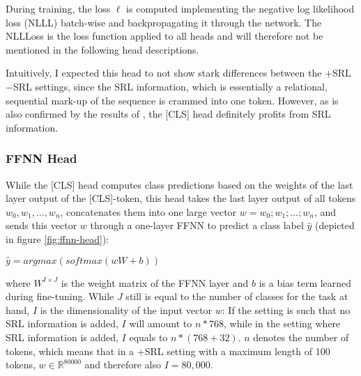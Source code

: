 During training, the loss $\ell $ is computed implementing the negative log likelihood loss
(NLLL) batch-wise and
backpropagating it through the network. The NLLLoss is the loss function applied to all
heads and will therefore not be mentioned in the following head descriptions.

Intuitively, I expected this head to not show stark differences between the +SRL $-$SRL settings,
since the SRL information, which is essentially a relational, sequential mark-up of the sequence is
crammed into one token. However, as is also confirmed by the results of \cite{zhang2019semantics},
the [CLS] head definitely profits from SRL information.


\subsubsection{FFNN Head}


While the [CLS] head computes class predictions based on the weights of the last layer
output of the [CLS]-token, this head takes the last layer output of all tokens $w_0,
w_1, \dotso , w_n$, concatenates them into one large vector $w = w_0 ; w_1 ; \dotso
; w_n$, and sends this vector $w$ through a one-layer FFNN to predict a class label
$\hat{y}$ (depicted in figure \ref{fig:ffnn-head}):

$\hat{y} = argmax(softmax(wW+b))$

where $W^{I\times J}$ is the weight matrix of the FFNN layer and $b$ is a bias term learned during
fine-tuning. While $J$ still is equal to the number of classes for the task at hand, $I$ is the
dimensionality of the input vector $w$: If the setting is such that no SRL information is added,
$I$ will amount to $n * 768$, while in the setting where SRL information is added, $I$ equals to $n
* (768+32)$. $n$ denotes the number of tokens, which means that in a +SRL setting with a maximum
length of 100 tokens, $w \in \mathbb{R}^{80000}$ and therefore also $I = 80,000$.

